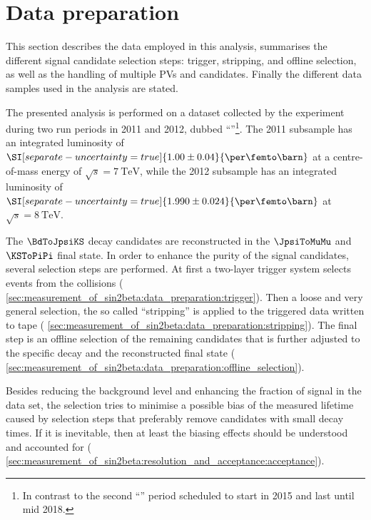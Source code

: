 
\section{Data preparation}
\label{sec:measurement_of_sin2beta:data_preparation}

This section describes the data employed in this analysis, summarises the
different signal candidate selection steps: trigger, stripping, and offline
selection, as well as the handling of multiple \acp{PV} and \Bmeson candidates.
Finally the different data samples used in the analysis are stated.

The presented analysis is performed on a dataset collected by the \LHCb
experiment during two run periods in 2011 and 2012, dubbed
\enquote{\RunOne{}}\footnote{In contrast to the second \enquote{\RunTwo{}} period
scheduled to start in 2015 and last until mid 2018.}. The 2011 subsample has an
integrated luminosity of
$\SI[separate-uncertainty=true]{1.00\pm0.04}{\per\femto\barn}$ at a
centre-of-mass energy of $\sqrt{s}=\SI{7}{\TeV}$, while the 2012 subsample has
an integrated luminosity of
$\SI[separate-uncertainty=true]{1.990\pm0.024}{\per\femto\barn}$ at
$\sqrt{s}=\SI{8}{\TeV}$.

The $\BdToJpsiKS$ decay candidates are reconstructed in the $\JpsiToMuMu$ and
$\KSToPiPi$ final state. In order to enhance the purity of the signal
candidates, several selection steps are performed. At first a two-layer
trigger system selects events from the \protonproton collisions (\cf
\cref{sec:measurement_of_sin2beta:data_preparation:trigger}). Then a loose and very general
selection, the so called \enquote{stripping} is applied to the triggered data
written to tape (\cf
\cref{sec:measurement_of_sin2beta:data_preparation:stripping}). The final step
is an offline selection of the remaining candidates that is further adjusted to
the specific decay and the reconstructed final state (\cf
\cref{sec:measurement_of_sin2beta:data_preparation:offline_selection}).

Besides reducing the background level and enhancing the fraction of signal in
the data set, the selection tries to minimise a possible bias of the measured
\Bd lifetime caused by selection steps that preferably remove candidates with
small decay times. If it is inevitable, then at least the biasing effects should
be understood and accounted for (\cf
\cref{sec:measurement_of_sin2beta:resolution_and_acceptance:acceptance}).

